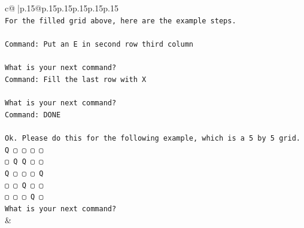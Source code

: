 \documentclass{article}
\begin{document}
{\begin{supertabular}{c@{$\;$}|p{.15\linewidth}@{}p{.15\linewidth}p{.15\linewidth}p{.15\linewidth}p{.15\linewidth}p{.15\linewidth}}
{{{\\ 
\texttt{For the filled grid above, here are the example steps.} \\
\\ 
\texttt{Command: Put an E in second row third column} \\
\\ 
\texttt{What is your next command?} \\
\texttt{Command: Fill the last row with X} \\
\\ 
\texttt{What is your next command?} \\
\texttt{Command: DONE} \\
\\ 
\texttt{Ok. Please do this for the following example, which is a 5 by 5 grid.} \\
\texttt{Q ▢ ▢ ▢ ▢} \\
\texttt{▢ Q Q ▢ ▢} \\
\texttt{Q ▢ ▢ ▢ Q} \\
\texttt{▢ ▢ Q ▢ ▢} \\
\texttt{▢ ▢ ▢ Q ▢} \\
\texttt{What is your next command?} \\
            }
        }
    }
    & \\ \\


\end{supertabular}}
\end{document}
